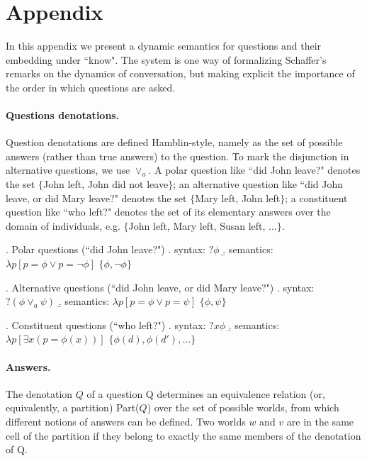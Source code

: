 \section*{Appendix}

In this appendix we present a dynamic semantics for questions and
their embedding under ``know". The system is one way of
formalizing Schaffer's remarks on the dynamics of conversation,
but making explicit the importance of the order in which questions
are
asked. %


 \paragraph{Questions denotations.}

Question denotations are defined Hamblin-style, namely as the set
of possible answers (rather than true answers) to the question. To
mark the disjunction in alternative questions, we use $\vee_a$. A
polar question like ``did John leave?" denotes the set $\{$John
left, John did not leave$\}$; an alternative question like ``did
John leave, or did Mary leave?" denotes the set $\{$Mary left,
John left$\}$; a constituent question like ``who left?" denotes
the set of its elementary answers over the domain of individuals,
e.g. $\{$John left, Mary left, Susan left, ...$\}$.

 \ex. Polar questions (``did John leave?")
 \a. syntax: $?\phi$
 \b. semantics: $\lambda p  [p=\phi \vee p=\neg \phi]$ \hfill $\{\phi, \neg \phi\}$

 \ex. Alternative questions (``did John leave, or did Mary leave?")
  \a. syntax: $?(\phi  \vee_a \psi)$
 \b. semantics: $\lambda p  [p=\phi \vee p= \psi]$ \hfill $\{\phi,   \psi\}$

\ex. Constituent questions (``who left?")
 \a. syntax: $?x \phi   $
 \b. semantics: $\lambda p  [\exists x (p=\phi(x))]$ \hfill $\{\phi(d),   \phi(d'),...\}$


\paragraph{Answers.} The denotation $Q$ of a question Q determines
an equivalence relation (or, equivalently, a partition) Part($Q$)
over the set of possible worlds, from which different notions of
answers can be defined. Two worlds $w$ and $v$ are in the same
cell of the partition if they belong to exactly the same members
of the denotation of Q.

